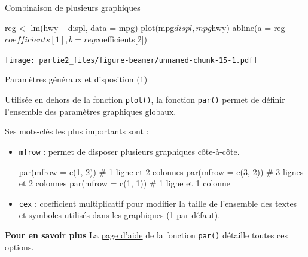 \documentclass[12pt,ignorenonframetext,]{beamer}
\newenvironment{Shaded}{}{}
\newcommand{\KeywordTok}[1]{\textcolor[rgb]{0.00,0.00,1.00}{#1}}
\newcommand{\DataTypeTok}[1]{#1}
\newcommand{\DecValTok}[1]{#1}
\newcommand{\StringTok}[1]{\textcolor[rgb]{0.00,0.50,0.50}{#1}}
\newcommand{\CommentTok}[1]{\textcolor[rgb]{0.00,0.50,0.00}{#1}}
\newcommand{\OperatorTok}[1]{#1}
\newcommand{\NormalTok}[1]{#1}
\renewenvironment{Shaded}{\begin{snugshade}}{\end{snugshade}}
\begin{document}
\begin{frame}[fragile]{Combinaison de plusieurs graphiques}

\footnotesize

\begin{Shaded}
\begin{Highlighting}[]
\NormalTok{reg <-}\StringTok{ }\KeywordTok{lm}\NormalTok{(hwy }\OperatorTok{~}\StringTok{ }\NormalTok{displ, }\DataTypeTok{data =}\NormalTok{ mpg)}
\KeywordTok{plot}\NormalTok{(mpg}\OperatorTok{$}\NormalTok{displ, mpg}\OperatorTok{$}\NormalTok{hwy)}
\KeywordTok{abline}\NormalTok{(}\DataTypeTok{a =}\NormalTok{ reg}\OperatorTok{$}\NormalTok{coefficients[}\DecValTok{1}\NormalTok{], }\DataTypeTok{b =}\NormalTok{ reg}\OperatorTok{$}\NormalTok{coefficients[}\DecValTok{2}\NormalTok{])}
\end{Highlighting}
\end{Shaded}

\texttt{[image: partie2\_files/figure-beamer/unnamed-chunk-15-1.pdf]}

\end{frame}

\begin{frame}[fragile]{Paramètres généraux et disposition (1)}

Utilisée en dehors de la fonction \texttt{plot()}, la fonction
\texttt{par()} permet de définir l'ensemble des paramètres graphiques
globaux.

\pause Ses mots-clés les plus importants sont :

\begin{itemize}
\item
  \texttt{mfrow} : permet de disposer plusieurs graphiques côte-à-côte.

\begin{Shaded}
\begin{Highlighting}[]
\KeywordTok{par}\NormalTok{(}\DataTypeTok{mfrow =} \KeywordTok{c}\NormalTok{(}\DecValTok{1}\NormalTok{, }\DecValTok{2}\NormalTok{)) }\CommentTok{# 1 ligne et 2 colonnes}
\KeywordTok{par}\NormalTok{(}\DataTypeTok{mfrow =} \KeywordTok{c}\NormalTok{(}\DecValTok{3}\NormalTok{, }\DecValTok{2}\NormalTok{)) }\CommentTok{# 3 lignes et 2 colonnes}
\KeywordTok{par}\NormalTok{(}\DataTypeTok{mfrow =} \KeywordTok{c}\NormalTok{(}\DecValTok{1}\NormalTok{, }\DecValTok{1}\NormalTok{)) }\CommentTok{# 1 ligne et 1 colonne}
\end{Highlighting}
\end{Shaded}
\item
  \texttt{cex} : coefficient multiplicatif pour modifier la taille de
  l'ensemble des textes et symboles utilisés dans les graphiques (1 par
  défaut).
\end{itemize}

\pause 

\textbf{Pour en savoir plus} La
\href{http://stat.ethz.ch/R-manual/R-devel/library/graphics/html/par.html}{page
d'aide} de la fonction \texttt{par()} détaille toutes ces options.

\end{frame}
\end{document}
